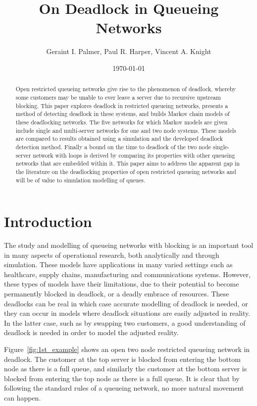\documentclass{article}
\title{On Deadlock in Queueing Networks}
\author{Geraint I. Palmer, Paul R. Harper, Vincent A. Knight}
\date{\today}
\numberwithin{equation}{section}
\begin{document}
\onehalfspacing

\maketitle


\begin{abstract}
Open restricted queueing networks give rise to the phenomenon of deadlock, whereby some customers may be unable to ever leave a server due to recursive upstream blocking.
This paper explores deadlock in restricted queueing networks, presents a method of detecting deadlock in these systems, and builds Markov chain models of these deadlocking networks.
The five networks for which Markov models are given include single and multi-server networks for one and two node systems.
These models are compared to results obtained using a simulation and the developed deadlock detection method.
Finally a bound on the time to deadlock of the two node single-server network with loops is derived by comparing its properties with other queueing networks that are embedded within it.
This paper aims to address the apparent gap in the literature on the deadlocking properties of open restricted queueing networks and will be of value to simulation modelling of queues.
\end{abstract}

\section{Introduction}

The study and modelling of queueing networks with blocking is an important tool in many aspects of operational research, both analytically and through simulation.
These models have applications in many varied settings such as healthcare, supply chains, manufacturing and communications systems.
However, these types of models have their limitations, due to their potential to become permanently blocked in deadlock, or a deadly embrace of resources.
These deadlocks can be real in which case accurate modelling of deadlock is needed, or they can occur in models where deadlock situations are easily adjusted in reality. In the latter case, such as by swapping two customers, a good understanding of deadlock is needed in order to model the adjusted reality.

Figure~\ref{fig:1st_example} shows an open two node restricted queueing network in deadlock.
The customer at the top server is blocked from entering the bottom node as there is a full queue, and similarly the customer at the bottom server is blocked from entering the top node as there is a full queue.
It is clear that by following the standard rules of a queueing network, no more natural movement can happen.
\end{document}
